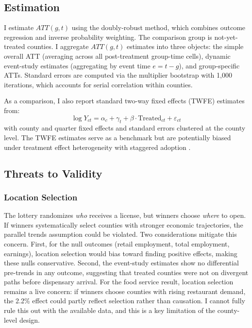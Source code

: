 \documentclass[12pt]{article}
\begin{document}
\subsection{Estimation}

I estimate $ATT(g,t)$ using the doubly-robust method, which combines outcome regression and inverse probability weighting. The comparison group is not-yet-treated counties. I aggregate $ATT(g,t)$ estimates into three objects: the simple overall ATT (averaging across all post-treatment group-time cells), dynamic event-study estimates (aggregating by event time $e = t - g$), and group-specific ATTs. Standard errors are computed via the multiplier bootstrap with 1,000 iterations, which accounts for serial correlation within counties.

As a comparison, I also report standard two-way fixed effects (TWFE) estimates from:
\begin{equation}
\log Y_{ct} = \alpha_c + \gamma_t + \beta \cdot \text{Treated}_{ct} + \varepsilon_{ct}
\end{equation}
with county and quarter fixed effects and standard errors clustered at the county level. The TWFE estimates serve as a benchmark but are potentially biased under treatment effect heterogeneity with staggered adoption \citep{GoodmanBacon2021, deChaisemartinDHaultfoeuille2020}.

\subsection{Threats to Validity}

\subsubsection*{Location Selection} The lottery randomizes \textit{who} receives a license, but winners choose \textit{where} to open. If winners systematically select counties with stronger economic trajectories, the parallel trends assumption could be violated. Two considerations mitigate this concern. First, for the null outcomes (retail employment, total employment, earnings), location selection would bias toward finding positive effects, making these nulls conservative. Second, the event-study estimates show no differential pre-trends in any outcome, suggesting that treated counties were not on divergent paths before dispensary arrival. For the food service result, location selection remains a live concern: if winners choose counties with rising restaurant demand, the 2.2\% effect could partly reflect selection rather than causation. I cannot fully rule this out with the available data, and this is a key limitation of the county-level design.
\end{document}
